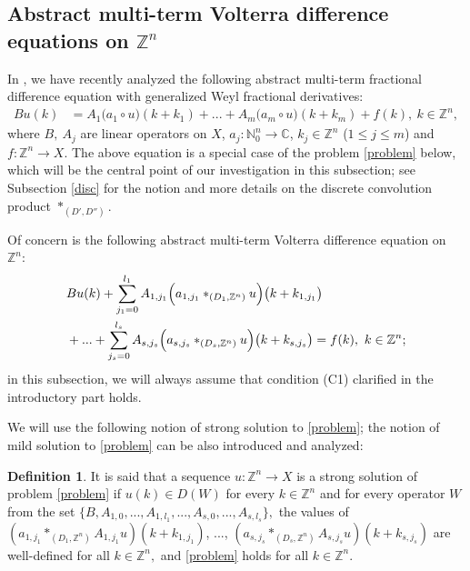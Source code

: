 \documentclass{amsart}
\theoremstyle{definition}
\newtheorem{defn}[thm]{Definition}
\theoremstyle{remark}
\numberwithin{equation}{section}
\begin{document}
\subsection{Abstract multi-term Volterra difference equations on ${\mathbb Z}^{n}$}\label{subs1}

In \cite{bilten}, we have recently analyzed the following abstract multi-term fractional difference equation with generalized Weyl fractional derivatives: 
\begin{align*}
Bu(k)&=A_{1}\bigl(a_{1}\circ u\bigr)(k+k_{1})+... +A_{m}\bigl(a_{m}\circ u\bigr)(k+k_{m})+f(k),\ k\in {\mathbb Z}^{n},
\end{align*}
where $B,\ A_{j}$ are linear operators on $X$, $a_{j} : {\mathbb N}_{0}^{n}\rightarrow {\mathbb C}$, $k_{j}\in {\mathbb Z}^{n}$ ($1\leq j\leq m$) and $f: {\mathbb Z}^{n} \rightarrow X$. The above equation is a special case of the problem \eqref{problem} below, which will be the central point of our investigation in this subsection; see Subsection \ref{disc} for the notion and more details on the discrete convolution product $\ast_{(D',D'')}$.

Of concern is the following abstract multi-term Volterra difference equation on ${\mathbb Z}^{n}:$
\begin{align}\notag & 
Bu(k)+\sum_{j_{1}=0}^{l_{1}}A_{1,j_{1}}\Bigl( a_{1,j_{1}} \ast_{(D_{1},{\mathbb Z}^{n})}u \Bigr)\bigl(k+k_{1,j_{1}}\bigr)
\\\label{problem}& +...+\sum_{j_{s}=0}^{l_{s}}A_{s,j_{s}}\Bigl( a_{s,j_{s}} \ast_{(D_{s},{\mathbb Z}^{n})} u\Bigr)\bigl(k+k_{s,j_{s}}\bigr)=f(k),\ k\in {\mathbb Z}^{n};
\end{align}
in this subsection, we will always assume that condition (C1) clarified in the introductory part holds.

We will use the following notion of strong solution to \eqref{problem}; the notion of mild solution to \eqref{problem} can be also introduced and analyzed:

\begin{defn}\label{diuke}
It is said that a sequence $u: {\mathbb Z}^{n}\rightarrow X$ is
a strong solution of problem \eqref{problem} if $u(k)\in D(W)$ for every $k\in {\mathbb Z}^{n} $ and for every operator $W$ from the set $\{B,A_{1,0},...,A_{1,l_{1}},..., A_{s,0},...,A_{s,l_{s}}\},$ the values of
$( a_{1,j_{1}} \ast_{(D_{1},{\mathbb Z}^{n})}A_{1,j_{1}}u )(k+k_{1,j_{1}}) $, ..., $( a_{s,j_{s}} \ast_{(D_{s},{\mathbb Z}^{n})}A_{s,j_{s}}u )(k+k_{s,j_{s}}) $ are well-defined for all $k\in {\mathbb Z}^{n},$ and \eqref{problem} holds for all $k\in {\mathbb Z}^{n}.$
\end{defn}
\end{document}
